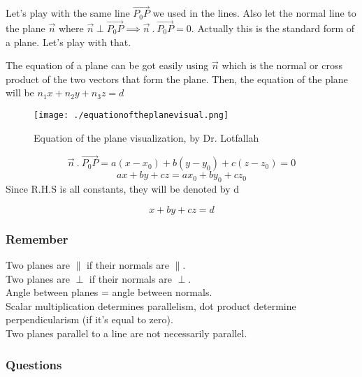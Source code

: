 \documentclass{article}
\begin{document}
Let's play with the same line $ \vec{ P_0P} $ we used in the lines. Also let the normal line to the plane $ \vec{ n } $ where $ \vec{ n } \perp \vec{ P_0P } \implies \vec{ n }\ .\ \vec{ P_0P } = 0$. Actually this is the standard form of a plane. Let's play with that.

The equation of a plane can be got easily using  $\vec{n}$ which is the normal or cross product of the two vectors that form the plane. Then, the equation of the plane will be $ n_1 x + n_2 y + n_3 z = d$
\begin{figure}[h]
	\centering
	\texttt{[image: ./equationoftheplanevisual.png]}
	\caption{Equation of the plane visualization, by Dr. Lotfallah}
	\label{fig:lotfalla_plane_1}
\end{figure}
\[
	\vec{ n }\ .\ \vec{ P_0P } = a(x-x_0) + b(y-y_0) + c(z-z_0) = 0 
\]
\[
	ax+by+cz = ax_0+by_0+cz_0	
\]
Since R.H.S is all constants, they will be denoted by d

\[
	x+by+cz = d
\]



\subsubsection{Remember}

Two planes are $ \parallel $ if their normals are $\parallel$. 
\\
Two planes are $ \perp $ if their normals are $\perp$. \\
Angle between planes = angle between normals.
\\
Scalar multiplication determines parallelism, dot product determine perpendicularism (if it's equal to zero).
\\
Two planes parallel to a line are not necessarily parallel.

\newpage
\subsubsection{Questions}
\end{document}
